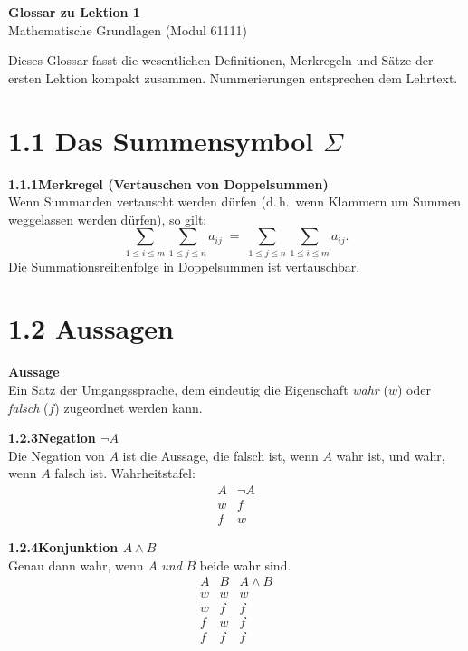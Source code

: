 \documentclass[a4paper,12pt]{article}
\newcommand{\gentry}[3]{%
  \noindent\textbf{#1\quad #2}\nopagebreak\\[0.2em]
  #3\par\smallskip
}
\begin{document}
\begin{center}
  {\LARGE\bfseries Glossar zu Lektion 1}\\[0.5em]
  {\large Mathematische Grundlagen (Modul 61111)}
\end{center}

\vspace{1em}

Dieses Glossar fasst die wesentlichen Definitionen, Merkregeln und Sätze der
ersten Lektion kompakt zusammen. Nummerierungen entsprechen dem Lehrtext.

\section*{1.1 \quad Das Summensymbol $\Sigma$}

\gentry{1.1.1}{Merkregel (Vertauschen von Doppelsummen)}{%
  Wenn Summanden vertauscht werden dürfen (d.\,h.\ wenn Klammern um Summen
  weggelassen werden dürfen), so gilt:
  \[
    \sum_{1 \le i \le m} \sum_{1 \le j \le n} a_{ij}
    \;=\;
    \sum_{1 \le j \le n} \sum_{1 \le i \le m} a_{ij}.
  \]
  Die Summationsreihenfolge in Doppelsummen ist vertauschbar.
}

\section*{1.2 \quad Aussagen}

\gentry{}{Aussage}{%
  Ein Satz der Umgangssprache, dem eindeutig die Eigenschaft \emph{wahr} ($w$)
  oder \emph{falsch} ($f$) zugeordnet werden kann.
}

\gentry{1.2.3}{Negation $\lnot A$}{%
  Die Negation von $A$ ist die Aussage, die falsch ist, wenn $A$ wahr ist,
  und wahr, wenn $A$ falsch ist. Wahrheitstafel:
  \[
    \begin{array}{c|c}
      A & \lnot A \\\hline
      w & f \\ f & w
    \end{array}
  \]
}

\gentry{1.2.4}{Konjunktion $A \land B$}{%
  Genau dann wahr, wenn $A$ \emph{und} $B$ beide wahr sind.
  \[
    \begin{array}{cc|c}
      A & B & A \land B \\\hline
      w & w & w \\ w & f & f \\ f & w & f \\ f & f & f
    \end{array}
  \]
}
\end{document}

